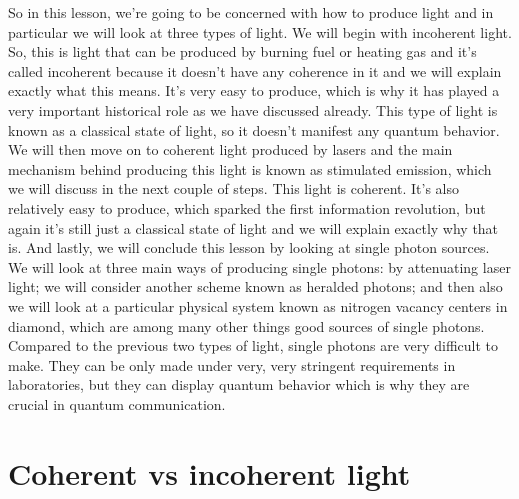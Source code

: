 So in this lesson, we're going to be concerned with how to produce light and in particular we will look at three types of light. We will begin with incoherent light. So, this is light that can be produced by burning fuel or heating gas and it's called incoherent because it doesn't have any coherence in it and we will explain exactly what this means. It's very easy to produce, which is why it has played a very important historical role as we have discussed already. This type of light is known as a classical state of light, so it doesn't manifest any quantum behavior. We will then move on to coherent light produced by lasers and the main mechanism behind producing this light is known as stimulated emission, which we will discuss in the next couple of steps. This light is coherent. It's also relatively easy to produce, which sparked the first information revolution, but again it's still just a classical state of light and we will explain exactly why that is. And lastly, we will conclude this lesson by looking at single photon sources. We will look at three main ways of producing single photons: by attenuating laser light; we will consider another scheme known as heralded photons; and then also we will look at a particular physical system known as nitrogen vacancy centers in diamond, which are among many other things good sources of single photons. Compared to the previous two types of light, single photons are very difficult to make. They can be only made under very, very stringent requirements in laboratories, but they can display quantum behavior which is why they are crucial in quantum communication.

\section{Coherent vs incoherent light}


